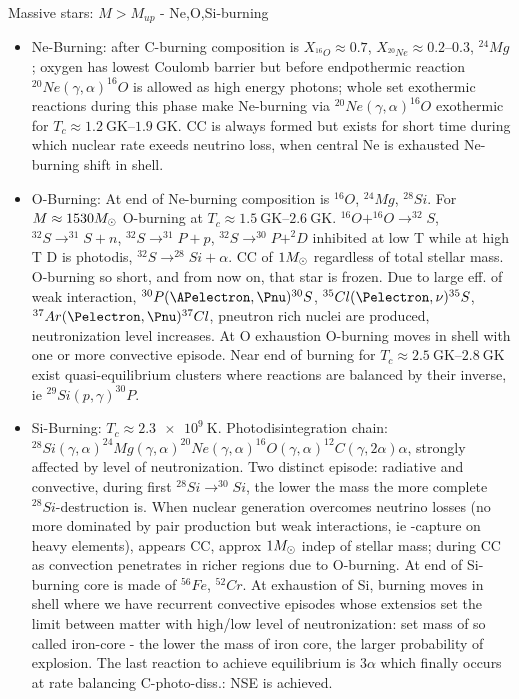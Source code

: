 \begin{frame}{Massive stars: $M>M_{up}$ - Ne,O,Si-burning}
    \begin{itemize}
        \item Ne-Burning: after C-burning composition is $X_{^{16}O}\approx0.7$, $X_{^{20}Ne}\approx\numrange{0.2}{0.3}$, $^{24}Mg$; oxygen has lowest Coulomb barrier but before endpothermic reaction $^{20}Ne(\gamma,\alpha)^{16}O$ is allowed as high energy photons; whole set exothermic reactions during this phase make Ne-burning via $^{20}Ne(\gamma,\alpha)^{16}O$ exothermic for $T_c\approx\SIrange{1.2}{1.9}{\giga\kelvin}$.
            CC is always formed but exists for short time during which nuclear rate exeeds neutrino loss, when central Ne is exhausted Ne-burning shift in shell.
        \item O-Burning: At end of Ne-burning composition is $^{16}O$, $^{24}Mg$, $^{28}Si$. For $M\approx\num{15}{30}M_{\odot}$ O-burning at $T_c\approx\SIrange{1.5}{2.6}{\giga\kelvin}$. $^{16}O+^{16}O\to^{32}S$, $^{32}S\to^{31}S+n$, $^{32}S\to^{31}P+p$, $^{32}S\to^{30}P+^2D$ inhibited at low T while at high T D is photodis, $^{32}S\to^{28}Si+\alpha$. CC of $1M_{\odot}$ regardless of total stellar mass. O-burning so short, and from now on, that star is frozen. Due to large eff. of weak interaction, $^{30}P(\APelectron,\Pnu)^{30}S$, $^{35}Cl(\Pelectron,\nu)^{35}S$, $^{37}Ar(\Pelectron,\Pnu)^{37}Cl$, pneutron rich nuclei are produced, neutronization level increases. At O exhaustion O-burning moves in shell with one or more convective episode. Near end of burning for $T_c\approx\SIrange{2.5}{2.8}{\giga\kelvin}$ exist quasi-equilibrium clusters where reactions are balanced by their inverse, ie $^{29}Si(p,\gamma)^{30}P$.
        \item Si-Burning: $T_c\approx\SI{2.3e9}{\kelvin}$. Photodisintegration chain: $^{28}Si(\gamma,\alpha)^{24}Mg(\gamma,\alpha)^{20}Ne(\gamma,\alpha)^{16}O(\gamma,\alpha)^{12}C(\gamma,2\alpha)\alpha$, strongly affected by level of neutronization. Two distinct episode: radiative and convective, during first $^{28}Si\to^{30}Si$, the lower the mass the more complete $^{28}Si$-destruction is. When nuclear generation overcomes neutrino losses (no more dominated by pair production but weak interactions, ie \Pelectron-capture on heavy elements), appears CC, approx $1M_{\odot}$ indep of stellar mass; during CC  as convection penetrates in richer regions due to O-burning. At end of Si-burning core is made of $^{56}Fe$, $^{52}Cr$. At exhaustion of Si, burning moves in shell where we have recurrent convective episodes whose extensios set the limit between matter with high/low level of neutronization: set mass of so called iron-core - the lower the mass of iron core, the larger probability of explosion. The last reaction to achieve equilibrium is $3\alpha$ which finally occurs at rate balancing C-photo-diss.: NSE is achieved.
    \end{itemize}
\end{frame}

